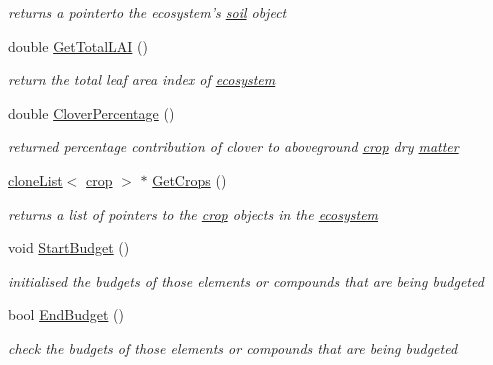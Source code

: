 \begin{DoxyCompactItemize}
\begin{DoxyCompactList}\small\item\em returns a pointerto the ecosystem's \hyperlink{classsoil}{soil} object \item\end{DoxyCompactList}\item 
double \hyperlink{classecosystem_a8aadfc5e6b887347617e3b7e73ced238}{GetTotalLAI} ()
\begin{DoxyCompactList}\small\item\em return the total leaf area index of \hyperlink{classecosystem}{ecosystem} \item\end{DoxyCompactList}\item 
double \hyperlink{classecosystem_a6278ea87551559c0f4c5deb803e13b33}{CloverPercentage} ()
\begin{DoxyCompactList}\small\item\em returned percentage contribution of clover to aboveground \hyperlink{classcrop}{crop} dry \hyperlink{classmatter}{matter} \item\end{DoxyCompactList}\item 
\hyperlink{classclone_list}{cloneList}$<$ \hyperlink{classcrop}{crop} $>$ $\ast$ \hyperlink{classecosystem_a76aa55a306d04f87b0acff0c405d3352}{GetCrops} ()
\begin{DoxyCompactList}\small\item\em returns a list of pointers to the \hyperlink{classcrop}{crop} objects in the \hyperlink{classecosystem}{ecosystem} \item\end{DoxyCompactList}\item 
void \hyperlink{classecosystem_adf56761a03f7ca49ee67b0dfc79d032e}{StartBudget} ()
\begin{DoxyCompactList}\small\item\em initialised the budgets of those elements or compounds that are being budgeted \item\end{DoxyCompactList}\item 
bool \hyperlink{classecosystem_a9560c609a6cd01430c2ebb44a65a4358}{EndBudget} ()
\begin{DoxyCompactList}\small\item\em check the budgets of those elements or compounds that are being budgeted \item\end{DoxyCompactList}\item 

\end{DoxyCompactItemize}
